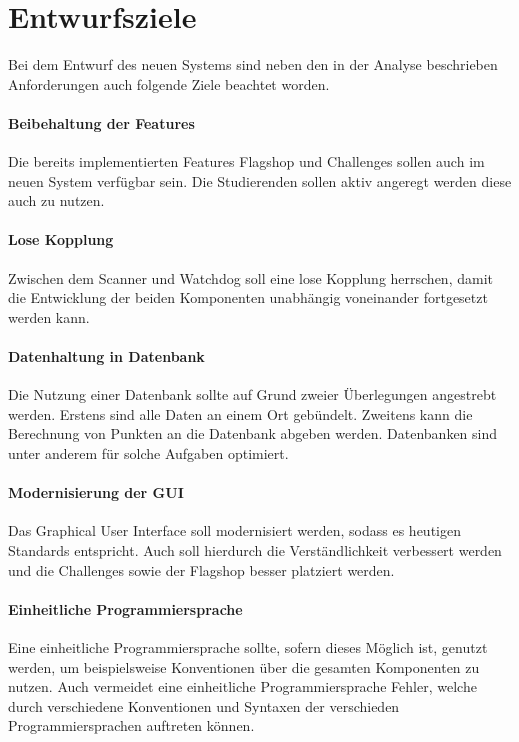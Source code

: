 \section{Entwurfsziele} \label{sec:Entwurfsziele}

Bei dem Entwurf des neuen Systems sind neben den in der Analyse beschrieben Anforderungen auch folgende Ziele beachtet worden.

\paragraph{Beibehaltung der Features}
Die bereits implementierten Features Flagshop und Challenges sollen auch im neuen System verfügbar sein. Die Studierenden sollen aktiv angeregt werden diese auch zu nutzen.

\paragraph{Lose Kopplung}
Zwischen dem Scanner und Watchdog soll eine lose Kopplung herrschen, damit die Entwicklung der beiden Komponenten unabhängig voneinander fortgesetzt werden kann.

\paragraph{Datenhaltung in Datenbank}
Die Nutzung einer Datenbank sollte auf Grund zweier Überlegungen angestrebt werden. Erstens sind alle Daten an einem Ort gebündelt. Zweitens kann die Berechnung von Punkten an die Datenbank abgeben werden. Datenbanken sind unter anderem für solche Aufgaben optimiert.

\paragraph{Modernisierung der GUI}
Das Graphical User Interface soll modernisiert werden, sodass es heutigen Standards entspricht. Auch soll hierdurch die Verständlichkeit verbessert werden und die Challenges sowie der Flagshop besser platziert werden.

\paragraph{Einheitliche Programmiersprache}
Eine einheitliche Programmiersprache sollte, sofern dieses Möglich ist, genutzt werden, um beispielsweise Konventionen über die gesamten Komponenten zu nutzen. Auch vermeidet eine einheitliche Programmiersprache Fehler, welche durch verschiedene Konventionen und Syntaxen der verschieden Programmiersprachen auftreten können.

